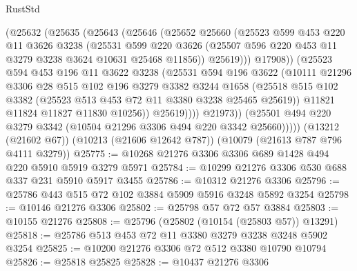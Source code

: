 \begin{lexlean}{RustStd}
\begin{coremodule}
{\begin{coremodule}
{{{{{{{{{{{{{{{{{{{{{{{{{{                  (@25632
                    (@25635
                      (@25643
                        (@25646
                          (@25652
                            @25660
                            (@25523
                              @599
                              @453
                              @220
                              @11
                              @3626
                              @3238
                              (@25531
                                @599
                                @220
                                @3626
                                (@25507 @596 @220 @453 @11 @3279 @3238 @3624 @10631 @25468 @11856))
                              @25619)))
                        @17908))
                    (@25523
                      @594
                      @453
                      @196
                      @11
                      @3622
                      @3238
                      (@25531
                        @594
                        @196
                        @3622
                        (@10111
                          @21296
                          @3306
                          @28
                          @515
                          @102
                          @196
                          @3279
                          @3382
                          @3244
                          @1658
                          (@25518
                            @515
                            @102
                            @3382
                            (@25523 @513 @453 @72 @11 @3380 @3238 @25465 @25619))
                          @11821
                          @11824
                          @11827
                          @11830
                          @10256))
                      @25619))))
              @21973))
          (@25501 @494 @220 @3279 @3342 (@10504 @21296 @3306 @494 @220 @3342 @25660)))))
    (@13212 (@21602 @67))
    (@10213 (@21606 @12642 @787))
    (@10079 (@21613 @787 @796 @4111 @3279))
@25775 := @10268 @21276 @3306 @3306 @689 @1428 @494 @220 @5910 @5919 @3279 @5971
@25784 := @10299 @21276 @3306 @530 @688 @337 @231 @5910 @5917 @3455
@25786 := @10312 @21276 @3306
@25796 := @25786 @443 @515 @72 @102 @3884 @5909 @5916 @3248 @5892 @3254
@25798 := @10146 @21276 @3306
@25802 := @25798 @57 @72 @57 @3884
@25803 := @10155 @21276
@25808 := @25796 (@25802 (@10154 (@25803 @57)) @13291)
@25818 := @25786 @513 @453 @72 @11 @3380 @3279 @3238 @3248 @5902 @3254
@25825 := @10200 @21276 @3306 @72 @512 @3380 @10790 @10794
@25826 := @25818 @25825
@25828 := @10437 @21276 @3306
}}}}}}}}}}}}}}}}}}}}}}}}}}
\end{coremodule}}
\end{coremodule}
\end{lexlean}
